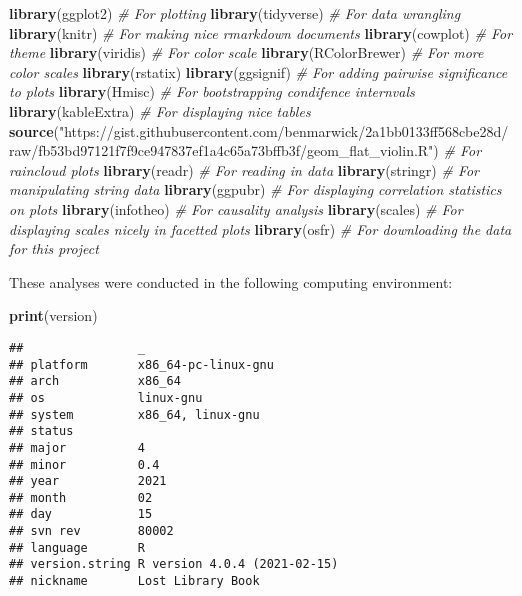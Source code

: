 \documentclass[]{book}
\newenvironment{Shaded}{\begin{snugshade}}{\end{snugshade}}
\newcommand{\CommentTok}[1]{\textcolor[rgb]{0.56,0.35,0.01}{\textit{#1}}}
\newcommand{\KeywordTok}[1]{\textcolor[rgb]{0.13,0.29,0.53}{\textbf{#1}}}
\newcommand{\NormalTok}[1]{#1}
\newcommand{\StringTok}[1]{\textcolor[rgb]{0.31,0.60,0.02}{#1}}
\begin{document}
\begin{Shaded}
\begin{Highlighting}[]
\KeywordTok{library}\NormalTok{(ggplot2)       }\CommentTok{# For plotting}
\KeywordTok{library}\NormalTok{(tidyverse)     }\CommentTok{# For data wrangling}
\KeywordTok{library}\NormalTok{(knitr)         }\CommentTok{# For making nice rmarkdown documents}
\KeywordTok{library}\NormalTok{(cowplot)       }\CommentTok{# For theme}
\KeywordTok{library}\NormalTok{(viridis)       }\CommentTok{# For color scale}
\KeywordTok{library}\NormalTok{(RColorBrewer)  }\CommentTok{# For more color scales}
\KeywordTok{library}\NormalTok{(rstatix)}
\KeywordTok{library}\NormalTok{(ggsignif)      }\CommentTok{# For adding pairwise significance to plots}
\KeywordTok{library}\NormalTok{(Hmisc)         }\CommentTok{# For bootstrapping condifence internvals}
\KeywordTok{library}\NormalTok{(kableExtra)    }\CommentTok{# For displaying nice tables}
\KeywordTok{source}\NormalTok{(}\StringTok{"https://gist.githubusercontent.com/benmarwick/2a1bb0133ff568cbe28d/raw/fb53bd97121f7f9ce947837ef1a4c65a73bffb3f/geom_flat_violin.R"}\NormalTok{) }\CommentTok{# For raincloud plots}
\KeywordTok{library}\NormalTok{(readr)        }\CommentTok{# For reading in data}
\KeywordTok{library}\NormalTok{(stringr)      }\CommentTok{# For manipulating string data}
\KeywordTok{library}\NormalTok{(ggpubr)       }\CommentTok{# For displaying correlation statistics on plots}
\KeywordTok{library}\NormalTok{(infotheo)     }\CommentTok{# For causality analysis}
\KeywordTok{library}\NormalTok{(scales)       }\CommentTok{# For displaying scales nicely in facetted plots}
\KeywordTok{library}\NormalTok{(osfr)         }\CommentTok{# For downloading the data for this project}
\end{Highlighting}
\end{Shaded}

These analyses were conducted in the following computing environment:

\begin{Shaded}
\begin{Highlighting}[]
\KeywordTok{print}\NormalTok{(version)}
\end{Highlighting}
\end{Shaded}

\begin{verbatim}
##                _                           
## platform       x86_64-pc-linux-gnu         
## arch           x86_64                      
## os             linux-gnu                   
## system         x86_64, linux-gnu           
## status                                     
## major          4                           
## minor          0.4                         
## year           2021                        
## month          02                          
## day            15                          
## svn rev        80002                       
## language       R                           
## version.string R version 4.0.4 (2021-02-15)
## nickname       Lost Library Book
\end{verbatim}
\end{document}
